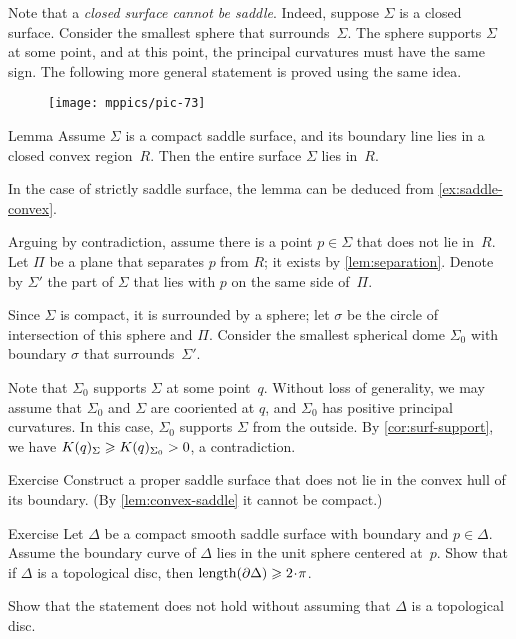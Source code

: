 Note that a \textit{closed surface cannot be saddle}.
Indeed, suppose $\Sigma$ is a closed surface.
Consider the smallest sphere that surrounds~$\Sigma$.
The sphere supports $\Sigma$ at some point, and at this point, the principal curvatures must have the same sign.
The following more general statement is proved using the same idea.

{

\begin{wrapfigure}[6]{r}{45 mm}
\vskip-6mm
\centering
\texttt{[image: mppics/pic-73]}
\vskip0mm
\end{wrapfigure}

\begin{thm}{Lemma}\label{lem:convex-saddle}
Assume $\Sigma$ is a compact saddle surface, and its boundary line lies in a closed convex  region~$R$.
Then the entire surface $\Sigma$ lies in~$R$.
\end{thm}

In the case of strictly saddle surface, the lemma can be deduced from \ref{ex:saddle-convex}.

Arguing by contradiction,
assume there is a point $p\in \Sigma$ that does not lie in~$R$.
Let $\Pi$ be a plane that separates $p$ from $R$; it exists by \ref{lem:separation}.
Denote by $\Sigma'$ the part of $\Sigma$ that lies with $p$ on the same side of~$\Pi$.

}

Since $\Sigma$ is compact, it is surrounded by a sphere;
let $\sigma$ be the circle of intersection of this sphere and $\Pi$.
Consider the smallest spherical dome $\Sigma_0$ with boundary $\sigma$ that surrounds~$\Sigma'$.

Note that $\Sigma_0$ supports $\Sigma$ at some point~$q$.
Without loss of generality, we may assume that $\Sigma_0$ and $\Sigma$ are cooriented at $q$, and $\Sigma_0$ has positive principal curvatures.
In this case, $\Sigma_0$ supports $\Sigma$ from the outside.
By \ref{cor:surf-support}, we have $K(q)_\Sigma\z\ge K(q)_{\Sigma_0}>0$, a contradiction.
\qeds

\begin{thm}{Exercise}\label{ex:proper-saddle}
Construct a proper saddle surface that does not lie in the convex hull of its boundary.
(By \ref{lem:convex-saddle} it cannot be compact.)
\end{thm}


\begin{thm}{Exercise}\label{ex:length-of-bry}
Let $\Delta$ be a compact smooth saddle surface with boundary and $p\in \Delta$.
Assume the boundary curve of $\Delta$ lies in the unit sphere centered at~$p$.
Show that if $\Delta$ is a topological disc, then $\length(\partial\Delta)\ge 2\cdot\pi$.

Show that the statement does not hold without assuming that $\Delta$ is a topological disc.
\end{thm}

